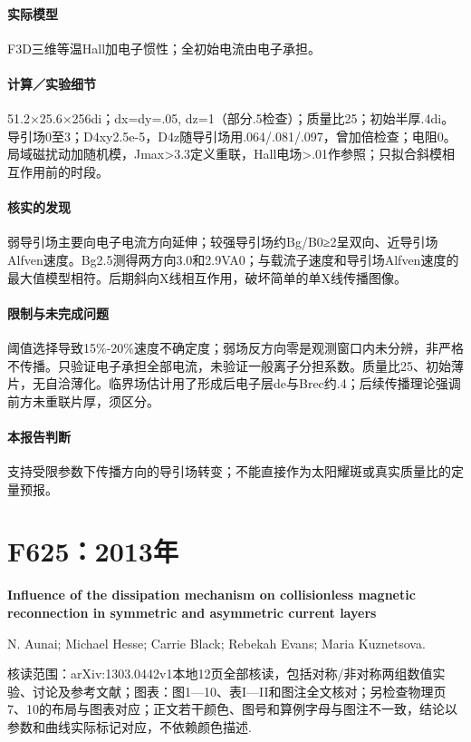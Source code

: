 \paragraph{实际模型}F3D三维等温Hall加电子惯性；全初始电流由电子承担。

\paragraph{计算／实验细节}51.2×25.6×256di；dx=dy=.05, dz=1（部分.5检查）；质量比25；初始半厚.4di。导引场0至3；D4xy2.5e-5，D4z随导引场用.064/.081/.097，曾加倍检查；电阻0。局域磁扰动加随机模，Jmax>3.3定义重联，Hall电场>.01作参照；只拟合斜模相互作用前的时段。

\paragraph{核实的发现}弱导引场主要向电子电流方向延伸；较强导引场约Bg/B0≥2呈双向、近导引场Alfven速度。Bg2.5测得两方向3.0和2.9VA0；与载流子速度和导引场Alfven速度的最大值模型相符。后期斜向X线相互作用，破坏简单的单X线传播图像。

\paragraph{限制与未完成问题}阈值选择导致15\%-20\%速度不确定度；弱场反方向零是观测窗口内未分辨，非严格不传播。只验证电子承担全部电流，未验证一般离子分担系数。质量比25、初始薄片，无自洽薄化。临界场估计用了形成后电子层de与Brec约.4；后续传播理论强调前方未重联片厚，须区分。

\paragraph{本报告判断}支持受限参数下传播方向的导引场转变；不能直接作为太阳耀斑或真实质量比的定量预报。

\section{F625：2013年}\label{paper:F625}

\textbf{Influence of the dissipation mechanism on collisionless magnetic reconnection in symmetric and asymmetric current layers}\citep{F625}\

N. Aunai;  Michael Hesse;  Carrie Black;  Rebekah Evans;  Maria Kuznetsova.

\textsf{核读范围：}arXiv:1303.0442v1本地12页全部核读，包括对称/非对称两组数值实验、讨论及参考文献；\textsf{图表：}图1—10、表I—II和图注全文核对；另检查物理页7、10的布局与图表对应；正文若干颜色、图号和算例字母与图注不一致，结论以参数和曲线实际标记对应，不依赖颜色描述.

